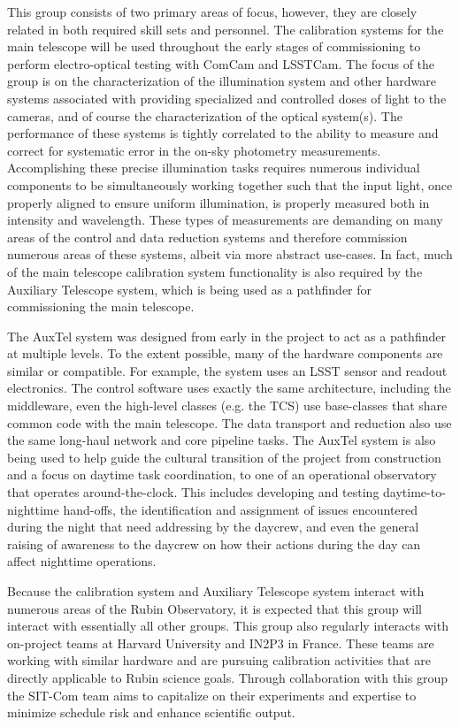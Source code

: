 \documentclass[SE,lsstdraft,authoryear,toc]{lsstdoc, lsstdraft}
\begin{document}
This group consists of two primary areas of focus, however, they are closely related in both required skill sets and personnel.
The calibration systems for the main telescope will be used throughout the early stages of commissioning to perform electro-optical testing with ComCam and LSSTCam.
The focus of the group is on the characterization of the illumination system and other hardware systems associated with providing specialized and controlled doses of light to the cameras, and of course the characterization of the optical system(s).
The performance of these systems is tightly correlated to the ability to measure and correct for systematic error in the on-sky photometry measurements.
Accomplishing these precise illumination tasks requires numerous individual components to be simultaneously working together such that the input light, once properly aligned to ensure uniform illumination, is properly measured both in intensity and wavelength.
These types of measurements are demanding on many areas of the control and data reduction systems and therefore commission numerous areas of these systems, albeit via more abstract use-cases.
In fact, much of the main telescope calibration system functionality is also required by the Auxiliary Telescope system, which is being used as a pathfinder for commissioning the main telescope.

The AuxTel system was designed from early in the project to act as a pathfinder at multiple levels.
To the extent possible, many of the hardware components are similar or compatible.
For example, the system uses an LSST sensor and readout electronics.
The control software uses exactly the same architecture, including the middleware, even the high-level classes (e.g. the TCS) use base-classes that share common code with the main telescope.
The data transport and reduction also use the same long-haul network and core pipeline tasks.
The AuxTel system is also being used to help guide the cultural transition of the project from construction and a focus on daytime task coordination, to one of an operational observatory that operates around-the-clock.
This includes developing and testing daytime-to-nighttime hand-offs, the identification and assignment of issues encountered during the night that need addressing by the daycrew, and even the general raising of awareness to the daycrew on how their actions during the day can affect nighttime operations.

Because the calibration system and Auxiliary Telescope system interact with numerous areas of the Rubin Observatory, it is expected that this group will interact with essentially all other groups.
This group also regularly interacts with on-project teams at Harvard University and IN2P3 in France.
These teams are working with similar hardware and are pursuing calibration activities that are directly applicable to Rubin science goals.
Through collaboration with this group the SIT-Com team aims to capitalize on their experiments and expertise to minimize schedule risk and enhance scientific output.
\end{document}
